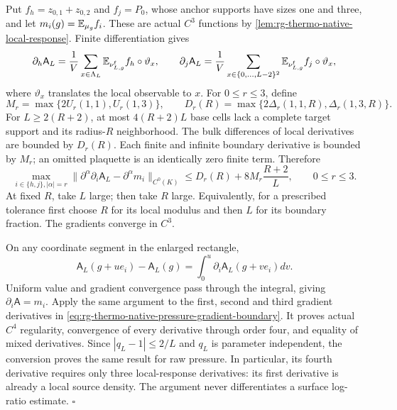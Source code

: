 Put \(f_h=z_{0,1}+z_{0,2}\) and \(f_j=P_0\), whose anchor supports
have sizes one and three, and let
\(m_i(g)=\mathbb E_{\mu_g}f_i\). These are actual \(C^3\) functions by
\cref{lem:rg-thermo-native-local-response}. Finite differentiation gives
\begin{equation}
 \partial_h\mathsf A_L=\frac1V\sum_{x\in\Lambda_L}
                   \mathbb E_{\nu^{\mathrm f}_{L,g}}f_h\circ\vartheta_x,
 \qquad
 \partial_j\mathsf A_L=\frac1V\sum_{x\in\{0,\ldots,L-2\}^2}
                   \mathbb E_{\nu^{\mathrm f}_{L,g}}f_j\circ\vartheta_x,
 \label{eq:rg-thermo-native-pressure-gradient}
\end{equation}
where \(\vartheta_x\) translates the local observable to \(x\).
For \(0\le r\le3\), define
\begin{equation}
 M_r=\max\{2U_r(1,1),U_r(1,3)\},\qquad
 D_r(R)=\max\{2\Delta_r(1,1,R),\Delta_r(1,3,R)\}.
 \label{eq:rg-thermo-native-gradient-bounds}
\end{equation}
For \(L\ge2(R+2)\), at most \(4(R+2)L\) base cells lack a complete
target support and its radius-\(R\) neighborhood. The bulk differences
of local derivatives are bounded by \(D_r(R)\). Each finite and infinite
boundary derivative is bounded by \(M_r\); an omitted plaquette is an
identically zero finite term. Therefore
\begin{equation}
 \max_{i\in\{h,j\},|\alpha|=r}
 \|\partial^\alpha\partial_i\mathsf A_L-
                       \partial^\alpha m_i\|_{C^0(K)}
 \le D_r(R)+8M_r\frac{R+2}{L},\qquad 0\le r\le3.
 \label{eq:rg-thermo-native-pressure-gradient-boundary}
\end{equation}
At fixed \(R\), take \(L\) large; then take \(R\) large. Equivalently,
for a prescribed tolerance first choose \(R\) for its local modulus and
then \(L\) for its boundary fraction. The gradients converge in \(C^3\).

On any coordinate segment in the enlarged rectangle,
\begin{equation}
 \mathsf A_L(g+u e_i)-\mathsf A_L(g)
       =\int_0^u\partial_i\mathsf A_L(g+v e_i)dv.
 \label{eq:rg-thermo-native-pressure-ftc}
\end{equation}
Uniform value and gradient convergence pass through the integral, giving
\(\partial_i\mathsf A=m_i\). Apply the same argument to the first,
second and third gradient derivatives in
\cref{eq:rg-thermo-native-pressure-gradient-boundary}. It proves actual
\(C^4\) regularity, convergence of every derivative through order four,
and equality of mixed derivatives. Since \(|q_L-1|\le2/L\) and
\(q_L\) is parameter independent, the conversion proves the same result
for raw pressure. In particular, its fourth derivative requires only
three local-response derivatives: its first derivative is already a local
source density. The argument never differentiates a surface log-ratio
estimate. \hfill\(\square\)

